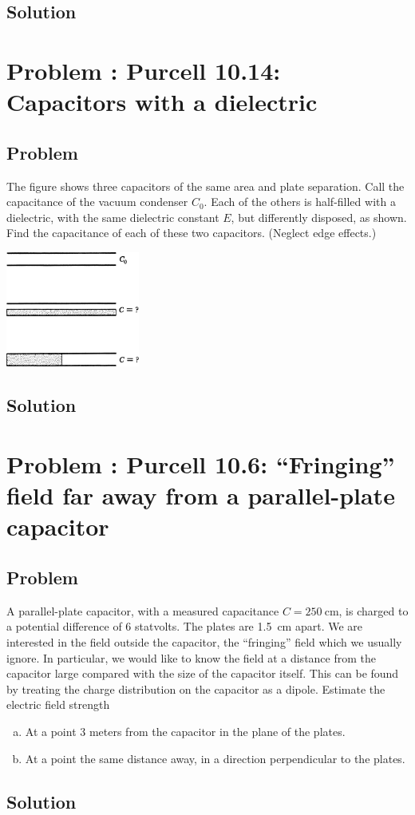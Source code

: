 \documentclass[solutions]{esg8022pset}
\begin{document}
\subsection{Solution}

\section{Problem \thesection: Purcell 10.14: Capacitors with a dielectric}
\subsection{Problem}
  The figure shows three capacitors of the same area and plate
  separation. Call the capacitance of the vacuum condenser $C_0$. Each of
  the others is half-filled with a dielectric, with the same dielectric constant
  $E$, but differently disposed, as shown. Find the capacitance of
  each of these two capacitors. (Neglect edge effects.)
  \begin{center}\includegraphics[width=0.33\textwidth]{ps04_08}\end{center}
\subsection{Solution}

\section{Problem \thesection: Purcell 10.6: ``Fringing'' field far away from a parallel-plate capacitor}
\subsection{Problem}
  A parallel-plate capacitor, with a measured capacitance $C = \SI{250}{\centi\meter}$,
  is charged to a potential difference of 6 statvolts. The plates
  are \SI{1.5}{\centi\meter} apart. We are interested in the field outside the capacitor,
  the ``fringing'' field which we usually ignore. In particular, we would
  like to know the field at a distance from the capacitor large compared
  with the size of the capacitor itself. This can be found by treating the
  charge distribution on the capacitor as a dipole. Estimate the electric
  field strength
  \begin{enumerate}[(a)]
    \item At a point 3 meters from the capacitor in the plane of the plates.
    \item At a point the same distance away, in a direction perpendicular to the plates.
  \end{enumerate}
\subsection{Solution}
\end{document}
